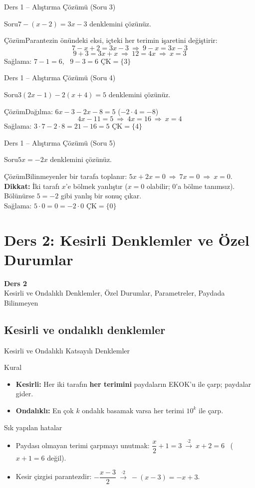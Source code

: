 \documentclass[aspectratio=169,11pt]{beamer}
\newcommand{\soru}[3]{%
\begin{frame}{#1}
  \begin{block}{Soru}\large #2\end{block}
  \pause
  \begin{exampleblock}{Çözüm}\large #3\end{exampleblock}
\end{frame}}
\begin{document}
\soru{Ders 1 -- Alıştırma Çözümü (Soru 3)}
{\(7-(x-2)=3x-3\) denklemini çözünüz.}
{Parantezin önündeki eksi, içteki her terimin işaretini değiştirir:
\[7-x+2=3x-3\ \Rightarrow\ 9-x=3x-3\]
\[9+3=3x+x\ \Rightarrow\ 12=4x\ \Rightarrow\ x=3\]
Sağlama: \(7-1=6\), \ \(9-3=6\) \checkmark \qquad \(\text{ÇK}=\{3\}\)}

\soru{Ders 1 -- Alıştırma Çözümü (Soru 4)}
{\(3(2x-1)-2(x+4)=5\) denklemini çözünüz.}
{Dağılma: \(6x-3-2x-8=5\) \quad (\(-2\cdot 4=-8\))
\[4x-11=5\ \Rightarrow\ 4x=16\ \Rightarrow\ x=4\]
Sağlama: \(3\cdot 7-2\cdot 8=21-16=5\) \checkmark \qquad \(\text{ÇK}=\{4\}\)}

\soru{Ders 1 -- Alıştırma Çözümü (Soru 5)}
{\(5x=-2x\) denklemini çözünüz.}
{Bilinmeyenler bir tarafa toplanır: \(5x+2x=0\ \Rightarrow\ 7x=0\ \Rightarrow\ x=0\).\\[3pt]
\textbf{Dikkat:} İki tarafı \(x\)'e bölmek yanlıştır (\(x=0\) olabilir; \(0\)'a bölme tanımsız). Bölünürse \(5=-2\) gibi yanlış bir sonuç çıkar.\\[3pt]
Sağlama: \(5\cdot 0=0=-2\cdot 0\) \checkmark \qquad \(\text{ÇK}=\{0\}\)}

\section{Ders 2: Kesirli Denklemler ve Özel Durumlar}
\begin{frame}
\centering\Large\color{anamavi}\textbf{Ders 2}\\[6pt]\normalsize Kesirli ve Ondalıklı Denklemler, Özel Durumlar, Parametreler, Paydada Bilinmeyen
\end{frame}

\subsection{Kesirli ve ondalıklı denklemler}
\begin{frame}{Kesirli ve Ondalıklı Katsayılı Denklemler}
\begin{block}{Kural}
\begin{itemize}
\item \textbf{Kesirli:} Her iki tarafın \textbf{her terimini} paydaların EKOK'u ile çarp; paydalar gider.
\item \textbf{Ondalıklı:} En çok \(k\) ondalık basamak varsa her terimi \(10^{k}\) ile çarp.
\end{itemize}
\end{block}
\begin{alertblock}{Sık yapılan hatalar}
\begin{itemize}
\item Paydası olmayan terimi çarpmayı unutmak: \(\dfrac{x}{2}+1=3\ \xrightarrow{\cdot 2}\ x+2=6\) \ (\(x+1=6\) değil).
\item Kesir çizgisi parantezdir: \(-\dfrac{x-3}{2}\ \xrightarrow{\cdot 2}\ -(x-3)=-x+3\).
\end{itemize}
\end{alertblock}
\end{frame}
\end{document}
